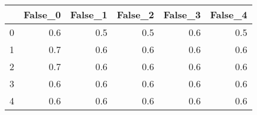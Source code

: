 \begin{tabular}{lrrrrr}
\toprule
{} &  False\_0 &  False\_1 &  False\_2 &  False\_3 &  False\_4 \\ \hline
\midrule
0 &      0.6 &      0.5 &      0.5 &      0.6 &      0.5 \\ \hline
1 &      0.7 &      0.6 &      0.6 &      0.6 &      0.6 \\ \hline
2 &      0.7 &      0.6 &      0.6 &      0.6 &      0.6 \\ \hline
3 &      0.6 &      0.6 &      0.6 &      0.6 &      0.6 \\ \hline
4 &      0.6 &      0.6 &      0.6 &      0.6 &      0.6 \\ \hline
\bottomrule
\end{tabular}
